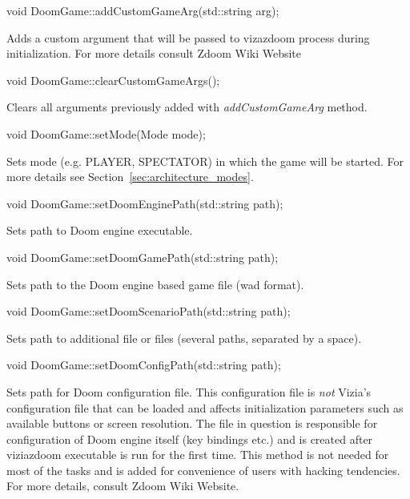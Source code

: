 \vspace{20pt}
\begin{clinee}
void DoomGame::addCustomGameArg(std::string arg);
\end{clinee}
	Adds a custom argument that will be passed to vizazdoom process during initialization. For more details consult Zdoom Wiki Website\cite{zdoom-wiki}


\vspace{20pt}
\begin{clinee}
void DoomGame::clearCustomGameArgs();
\end{clinee}
	Clears all arguments previously added with \emph{addCustomGameArg} method.


\vspace{20pt}
\begin{clinee}
void DoomGame::setMode(Mode mode);
\end{clinee}
	Sets mode (e.g. PLAYER, SPECTATOR) in which the game will be started. For more details see Section~\ref{sec:architecture_modes}.


\vspace{20pt}
\begin{clinee}
void DoomGame::setDoomEnginePath(std::string path);
\end{clinee}

Sets path to Doom engine executable.


\vspace{20pt}
\begin{clinee}
void DoomGame::setDoomGamePath(std::string path);
\end{clinee}

Sets path to the Doom engine based game file (wad format).


\vspace{20pt}
\begin{clinee}
void DoomGame::setDoomScenarioPath(std::string path);
\end{clinee}
	Sets path to additional file or files (several paths, separated by a space).


\vspace{20pt}
\begin{clinee}
void DoomGame::setDoomConfigPath(std::string path);
\end{clinee}
	Sets path for Doom configuration file. This configuration file is \emph{not} Vizia's configuration file that can be loaded and affects initialization parameters such as available buttons or screen resolution. The file in question is responsible for configuration of Doom engine itself (key bindings etc.) and is created after viziazdoom executable is run for the first time. This method is not needed for most of the tasks and is added for convenience of users with hacking tendencies. For more details, consult Zdoom Wiki Website\cite{zdoom-wiki}.


